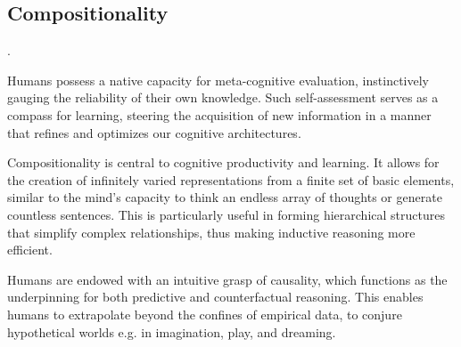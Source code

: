 \subsection{Compositionality}
\cite{Lake_Ullman_Tenenbaum_Gershman_2017}.

Humans possess a native capacity for meta-cognitive evaluation, instinctively gauging the reliability of their own knowledge. Such self-assessment serves as a compass for learning, steering the acquisition of new information in a manner that refines and optimizes our cognitive architectures.

Compositionality is central to cognitive productivity and learning. It allows for the creation of infinitely varied representations from a finite set of basic elements, similar to the mind's capacity to think an endless array of thoughts or generate countless sentences. This is particularly useful in forming hierarchical structures that simplify complex relationships, thus making inductive reasoning more efficient.

Humans are endowed with an intuitive grasp of causality, which functions as the underpinning for both predictive and counterfactual reasoning.  This enables humans to extrapolate beyond the confines of empirical data, to conjure hypothetical worlds e.g. in imagination, play, and dreaming.









